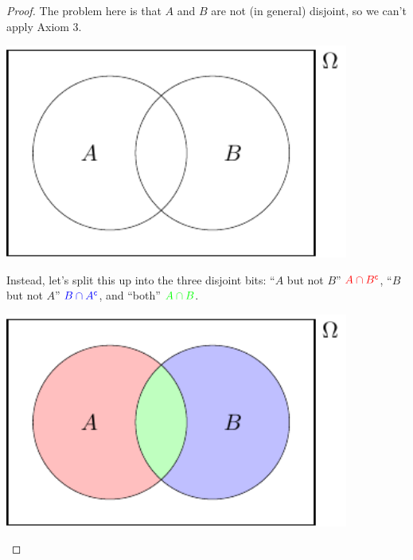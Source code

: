 \documentclass[
  a4paper,
]{book}
\theoremstyle{definition}
\theoremstyle{definition}
\theoremstyle{definition}
\theoremstyle{definition}
\theoremstyle{remark}
\begin{document}
\begin{proof}
The problem here is that \(A\) and \(B\) are not (in general) disjoint, so we can't apply Axiom 3.

\begin{center}\includegraphics[width=320pt]{math1710_files/figure-latex/add3-1} \end{center}

Instead, let's split this up into the three disjoint bits: {``\(A\) but not \(B\)''} \(\color{red}{A \cap B^\mathsf{c}}\), {``\(B\) but not \(A\)''} \(\color{blue}{B \cap A^\mathsf{c}}\), and {``both''} \(\color{green}{A \cap B}\).

\begin{center}\includegraphics[width=320pt]{math1710_files/figure-latex/add4-1} \end{center}


\end{proof}
\end{document}

